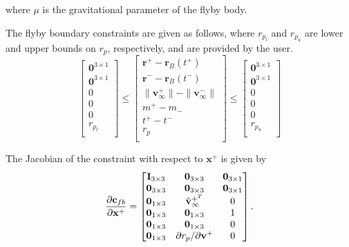 \noindent where $\mu$ is the gravitational parameter of the flyby body. 

The flyby boundary constraints are given as follows, where $r_{p_l}$ and $r_{p_u}$ are lower and upper bounds on $r_p$, respectively, and are provided by the user.
\begin{equation}
\begin{bmatrix}
   \mathbf{0}^{3 \times 1} \\
   \mathbf{0}^{3 \times 1} \\
   0 \\
   0 \\
   0 \\
   r_{p_l} \\
\end{bmatrix}
\leq
\begin{bmatrix}
   \mathbf{r}^{+} - \mathbf{r}_B(t^+) \\
   \mathbf{r}^{-} - \mathbf{r}_B(t^-) \\
   \| \mathbf{v}_{\infty}^{+}\| - \|\mathbf{v}_{\infty}^{-} \| \\
   m^{+} - m_{-} \\
   t^{+} - t^{-} \\
   r_p \\
\end{bmatrix}
\leq
\begin{bmatrix}
   \mathbf{0}^{3 \times 1} \\
   \mathbf{0}^{3 \times 1} \\
   0 \\
   0 \\
   0 \\
   r_{p_u} \\
\end{bmatrix}
\end{equation}

The Jacobian of the constraint with respect to $\mathbf{x}^+$ is given by
\begin{equation}
\frac{\partial \mathbf{c}_{fb}}{\partial \mathbf{x}^+} = 
\begin{bmatrix}
   \mathbf{I}_{3 \times 3}    & \mathbf{0}_{3 \times 3}  & \mathbf{0}_{3 \times 1} \\
   \mathbf{0}_{3 \times 3} & \mathbf{0}_{3 \times 3}  & \mathbf{0}_{3 \times 1} \\
    \mathbf{0}_{1 \times 3} & \hat{\mathbf{v}}_{\infty}^{+^T}   & 0 \\
   \mathbf{0}_{1 \times 3} &  \mathbf{0}_{1 \times 3} & 1 \\
   \mathbf{0}_{1 \times 3} &  \mathbf{0}_{1 \times 3} & 0 \\
   \mathbf{0}_{1 \times 3} & \partial r_p/ \partial \mathbf{v}^+  & 0  \\
\end{bmatrix}.
\end{equation}

